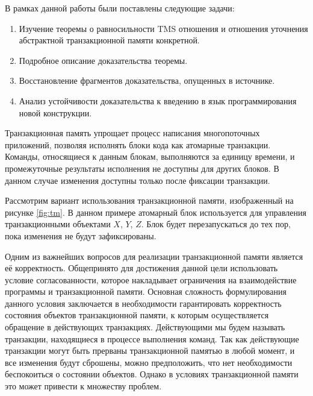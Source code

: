 




\ProblemStatement
В рамках данной работы были поставлены следующие задачи:
\begin{enumerate}
\item Изучение теоремы о равносильности TMS отношения и отношения уточнения абстрактной транзакционной памяти конкретной.
\item Подробное описание доказательства теоремы.
\item Восстановление фрагментов доказательства, опущенных в источнике.
\item Анализ устойчивости доказательства к введению в язык программирования новой конструкции.
\end{enumerate}
  
\Intro
Транзакционная память упрощает процесс написания многопоточных приложений, позволяя исполнять блоки кода как атомарные транзакции. Команды, относящиеся к данным блокам, выполняются за единицу времени, и промежуточные результаты исполнения не доступны для других блоков. В данном случае изменения доступны только после фиксации транзакции. 

Рассмотрим вариант использования транзакционной памяти, изображенный на рисунке \ref{fig:tm}. В данном примере атомарный блок используется для управления транзакционными объектами $X$, $Y$, $Z$. Блок будет перезапускаться до тех пор, пока изменения не будут зафиксированы.

Одним из важнейших вопросов для реализации транзакционной памяти является её корректность. Общепринято для достижения данной цели использовать условие согласованности, которое накладывает ограничения на взаимодействие программы и транзакционной памяти. Основная сложность формулирования данного условия заключается в необходимости гарантировать корректность состояния объектов транзакционной памяти, к которым осуществляется обращение в действующих транзакциях. Действующими мы будем называть транзакции, находящиеся в процессе выполнения команд. Так как действующие транзакции могут быть прерваны транзакционной памятью в любой момент, и все изменения будут сброшены, можно предположить, что нет необходимости беспокоиться о состоянии объектов. Однако в условиях транзакционной памяти это может привести к множеству проблем.

